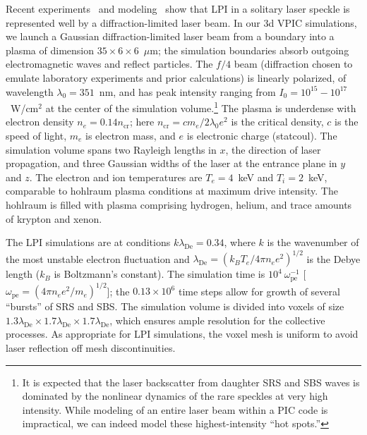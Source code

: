 \documentclass[journal,twoside]{IEEEtran}
\newcommand{\lde}      {\lambda_{\mathrm{De}}}
\newcommand{\wpe}      {\omega_{\mathrm{pe}}}
\begin{document}
Recent experiments~\cite{Kline_PRL_2005} and
modeling~\cite{Yin_et_al_PRL_2007_SRS} show that LPI in a solitary
laser speckle is represented well by a diffraction-limited laser beam.
In our 3d VPIC simulations, we launch a Gaussian diffraction-limited
laser beam from a boundary into a plasma of dimension $35 \times 6
\times 6$~$\mu$m; the simulation boundaries absorb outgoing
electromagnetic waves and reflect particles.  The $f/4$ beam
(diffraction chosen to emulate laboratory experiments and prior
calculations) is linearly polarized, of wavelength $\lambda_0 =
351$~nm, and has peak intensity ranging from $I_0 = 10^{15} -
10^{17}$~W/cm$^2$ at the center of the simulation volume.\footnote{It
is expected that the laser backscatter from daughter SRS and SBS waves
is dominated by the nonlinear dynamics of the rare speckles at very
high intensity.  While modeling of an entire laser beam within a PIC
code is impractical, we can indeed model these highest-intensity ``hot
spots.''}
The plasma is underdense with electron density $n_e = 0.14
n_{\mathrm{cr}}$; here $n_{\mathrm{cr}} = c m_e / 2 \lambda_0 e^2$ is
the critical density, $c$ is the speed of light, $m_e$ is electron
mass, and $e$ is electronic charge (statcoul).  The simulation volume
spans two Rayleigh lengths in $x$, the direction of laser propagation,
and three Gaussian widths of the laser at the entrance plane in $y$
and $z$.  The electron and ion temperatures are $T_e = 4$~keV and $T_i
= 2$~keV, comparable to hohlraum plasma conditions at maximum drive
intensity.  The hohlraum is filled with plasma comprising hydrogen,
helium, and trace amounts of krypton and xenon.

The LPI simulations are at conditions $k \lde = 0.34$, where $k$ is
the wavenumber of the most unstable electron fluctuation and $\lde =
(k_B T_e / 4 \pi n_e e^2)^{1/2}$ is the Debye length ($k_B$ is
Boltzmann's constant).  The simulation time is $10^4~\wpe^{-1}$ [$\wpe
= (4 \pi n_e e^2 / m_e)^{1/2}$]; the $0.13 \times 10^6$ time steps
allow for growth of several ``bursts'' of SRS and SBS.  The simulation
volume is divided into voxels of size $1.3\lde \times 1.7\lde \times
1.7\lde$, which ensures ample resolution for the collective processes.
As appropriate for LPI simulations, the voxel mesh is uniform to avoid
laser reflection off mesh discontinuities.
\end{document}
